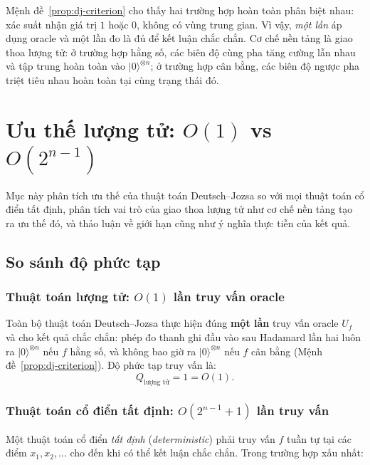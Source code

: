 \begin{remark}
Mệnh đề~\ref{prop:dj-criterion} cho thấy hai trường hợp hoàn toàn phân biệt
nhau: xác suất nhận giá trị $1$ hoặc $0$, không có vùng trung gian. Vì vậy,
\emph{một lần} áp dụng oracle và một lần đo là đủ để kết luận chắc chắn.
Cơ chế nền tảng là giao thoa lượng tử: ở trường hợp hằng số, các biên độ cùng
pha tăng cường lẫn nhau và tập trung hoàn toàn vào $|0\rangle^{\otimes n}$; ở
trường hợp cân bằng, các biên độ ngược pha triệt tiêu nhau hoàn toàn tại cùng
trạng thái đó.
\end{remark}

\section{Ưu thế lượng tử: $O(1)$ vs $O(2^{n-1})$}
Mục này phân tích ưu thế của thuật toán Deutsch--Jozsa so với mọi thuật toán
cổ điển tất định, phân tích vai trò của giao thoa lượng tử như cơ chế nền tảng
tạo ra ưu thế đó, và thảo luận về giới hạn cũng như ý nghĩa thực tiễn của kết
quả.
 
\subsection*{So sánh độ phức tạp}
 
\subsubsection*{Thuật toán lượng tử: $O(1)$ lần truy vấn oracle}
 
Toàn bộ thuật toán Deutsch--Jozsa
thực hiện đúng \textbf{một lần} truy vấn oracle $U_f$ và cho kết quả chắc chắn:
phép đo thanh ghi đầu vào sau Hadamard lần hai luôn ra $|0\rangle^{\otimes n}$
nếu $f$ hằng số, và không bao giờ ra $|0\rangle^{\otimes n}$ nếu $f$ cân bằng
(Mệnh đề~\ref{prop:dj-criterion}). Độ phức tạp truy vấn là:
\begin{equation}
    Q_{\text{lượng tử}} = 1 = O(1).
    \label{eq:quantum-complexity}
\end{equation}
 
\subsubsection*{Thuật toán cổ điển tất định: $O(2^{n-1}+1)$ lần truy vấn}
 
Một thuật toán cổ điển \emph{tất định} (\textit{deterministic}) phải truy vấn
$f$ tuần tự tại các điểm $x_1, x_2, \ldots$ cho đến khi có thể kết luận chắc
chắn. Trong trường hợp xấu nhất:
 
